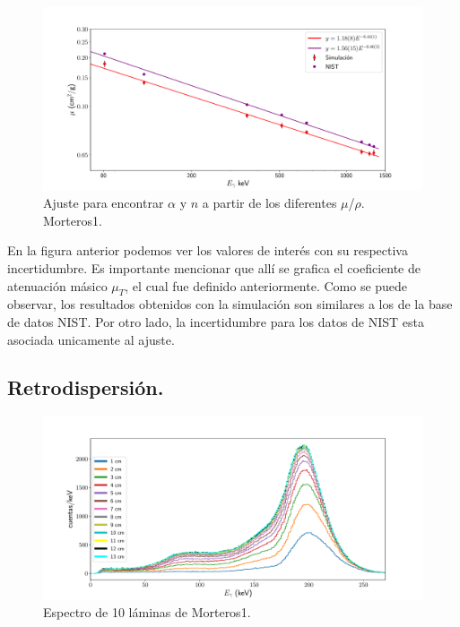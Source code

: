 \begin{figure}[H]
	\centering
	\includegraphics[width=1.0\linewidth]{Kap4/mu-trans-m1.pdf}
	\caption{Ajuste para encontrar $\alpha$ y $n$ a partir de los diferentes $\mu$/$\rho$. Morteros1.}
	\label{fig:mu-trans-m1}
\end{figure}

En la figura anterior podemos ver los valores de interés con su respectiva incertidumbre. Es importante mencionar que allí se grafica el coeficiente de atenuación másico $\mu_T$, el cual fue definido anteriormente. Como se puede observar, los resultados obtenidos con la simulación son similares a los de la base de datos NIST. Por otro lado, la incertidumbre para los datos de NIST esta asociada unicamente al ajuste.

 
\subsection{Retrodispersión.}

\begin{figure}[H]
	\centering
	\includegraphics[width=1.0\linewidth]{Kap4/espectros_m1.pdf}
	\caption{Espectro de 10 láminas de Morteros1.}
	\label{fig:espectrosm1}
\end{figure}

